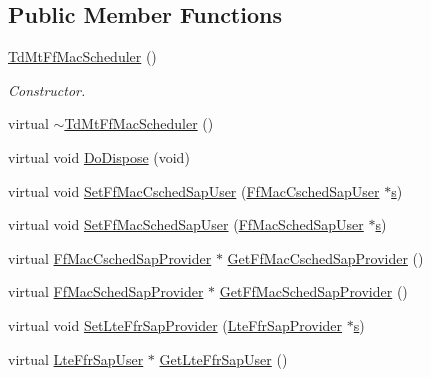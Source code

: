 \subsection*{Public Member Functions}
\begin{DoxyCompactItemize}
\item 
\hyperlink{classns3_1_1TdMtFfMacScheduler_af9f1e76d9488fd5ea9add89d574cb90f}{Td\+Mt\+Ff\+Mac\+Scheduler} ()
\begin{DoxyCompactList}\small\item\em Constructor. \end{DoxyCompactList}\item 
virtual \hyperlink{classns3_1_1TdMtFfMacScheduler_a12aae6b9739c7f5fdd95ff657bc647ea}{$\sim$\+Td\+Mt\+Ff\+Mac\+Scheduler} ()
\item 
virtual void \hyperlink{classns3_1_1TdMtFfMacScheduler_a8bc40bbb105e766f87f1272bc52bcc86}{Do\+Dispose} (void)
\item 
virtual void \hyperlink{classns3_1_1TdMtFfMacScheduler_ac5794f8cefe66c275767268b94886150}{Set\+Ff\+Mac\+Csched\+Sap\+User} (\hyperlink{classns3_1_1FfMacCschedSapUser}{Ff\+Mac\+Csched\+Sap\+User} $\ast$\hyperlink{generate__test__data__lte__sinr_8m_ad83eeb3a142285d1243a08c6b7026df8}{s})
\item 
virtual void \hyperlink{classns3_1_1TdMtFfMacScheduler_a65477d53b32deb62ab45edabfd5e63eb}{Set\+Ff\+Mac\+Sched\+Sap\+User} (\hyperlink{classns3_1_1FfMacSchedSapUser}{Ff\+Mac\+Sched\+Sap\+User} $\ast$\hyperlink{generate__test__data__lte__sinr_8m_ad83eeb3a142285d1243a08c6b7026df8}{s})
\item 
virtual \hyperlink{classns3_1_1FfMacCschedSapProvider}{Ff\+Mac\+Csched\+Sap\+Provider} $\ast$ \hyperlink{classns3_1_1TdMtFfMacScheduler_a3f5d31f314c58fd09a8ad55bb6d9b5a0}{Get\+Ff\+Mac\+Csched\+Sap\+Provider} ()
\item 
virtual \hyperlink{classns3_1_1FfMacSchedSapProvider}{Ff\+Mac\+Sched\+Sap\+Provider} $\ast$ \hyperlink{classns3_1_1TdMtFfMacScheduler_a64c346d635fad9488c6ba730c886eca0}{Get\+Ff\+Mac\+Sched\+Sap\+Provider} ()
\item 
virtual void \hyperlink{classns3_1_1TdMtFfMacScheduler_a743dbc12cc84f5f50a174e050686903e}{Set\+Lte\+Ffr\+Sap\+Provider} (\hyperlink{classns3_1_1LteFfrSapProvider}{Lte\+Ffr\+Sap\+Provider} $\ast$\hyperlink{generate__test__data__lte__sinr_8m_ad83eeb3a142285d1243a08c6b7026df8}{s})
\item 
virtual \hyperlink{classns3_1_1LteFfrSapUser}{Lte\+Ffr\+Sap\+User} $\ast$ \hyperlink{classns3_1_1TdMtFfMacScheduler_adcf1dbd3a7b2e8cdc986a9cd97c1872c}{Get\+Lte\+Ffr\+Sap\+User} ()

\end{DoxyCompactItemize}
